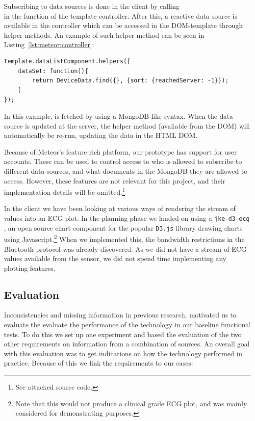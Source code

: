 Subscribing to data sources is done in the client by calling\\  in the  function of the template controller. After this, a reactive data source is available in the controller which can be accessed in the DOM-template through helper methods. An example of such helper method can be seen in Listing~\ref{lst:meteor:controller}:\\

\begin{lstlisting}[caption={Template helper exposing a reactive data source}, label={lst:meteor:controller}, basicstyle=\small]
Template.dataListComponent.helpers({
    dataSet: function(){
        return DeviceData.find({}, {sort: {reachedServer: -1}});
    }
});
\end{lstlisting}
In this example,  is fetched by using a MongoDB-like syntax. When the data source is updated at the server, the  helper method (available from the DOM) will automatically be re-run, updating the data in the HTML DOM.

Because of Meteor's feature rich platform, our prototype has support for user accounts. These can be used to control access to who is allowed to subscribe to different data sources, and what documents in the MongoDB they are allowed to access. However, these features are not relevant for this project, and their implementation details will be omitted.\footnote{ See attached source code.}

In the client we have been looking at various ways of rendering the stream of values into an ECG plot. In the planning phase we landed on using a \texttt{jke-d3-ecg} \cite{jke:d3}, an open source chart component for the popular \texttt{D3.js} library drawing charts using Javascript.\footnote{ Note that this would not produce a clinical grade ECG plot, and was mainly considered for demonstrating purposes.} When we implemented this, the bandwidth restrictions in the Bluetooth protocol was already discovered. As we did not have a stream of ECG values available from the sensor, we did not spend time implementing any plotting features. 


\subsection{Evaluation} %
\label{sub:evaluation}

Inconsistencies and missing information in previous research, motivated us to evaluate the evaluate the performance of the technology in our baseline functional tests. To do this we set up one experiment and based the evaluation of the two other requirements on information from a combination of sources. An overall goal with this evaluation was to get indications on how the technology performed in practice. Because of this we link the requirements to our cases:

